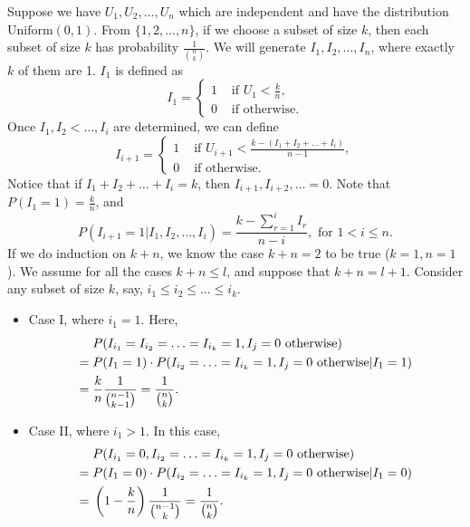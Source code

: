 \documentclass[15pt,a4paper]{book}
\theoremstyle{definition}
\begin{document}
Suppose we have $U_{1},U_{2},\ldots,U_{n}$ which are independent and have the distribution $\text{Uniform}(0,1)$. From $\{1,2,\ldots,n\}$, if we choose a subset of size $k$, then each subset of size $k$ has probability $\frac{1}{\binom{n}{k}}$. We will generate $I_{1},I_{2},\ldots,I_{n}$, where exactly $k$ of them are 1. $I_{1}$ is defined as
\begin{equation}
    I_{1} = \begin{cases}
        1 &\text{ if } U_{1} < \frac{k}{n},\\
        0 &\text{ if otherwise}.
    \end{cases}
\end{equation}
Once $I_{1},I_{2}<\ldots,I_{i}$ are determined, we can define
\begin{equation}
    I_{i+1} = \begin{cases}
        1 &\text{ if } U_{i+1} < \frac{k-(I_{1}+I_{2}+\ldots+I_{i})}{n-1},\\
        0 &\text{ if otherwise}.
    \end{cases}
\end{equation}
Notice that if $I_{1}+I_{2}+\ldots+I_{i} = k$, then $I_{i+1},I_{i+2},\ldots = 0$. Note that $P(I_{1}=1) = \frac{k}{n}$, and
\begin{equation}
    P(I_{i+1}=1|I_{1},I_{2},\ldots,I_{i}) = \frac{k-\sum_{r=1}^{i} I_{r}}{n-i}, \text{ for } 1 < i \leq n.
\end{equation}
If we do induction on $k+n$, we know the case $k+n = 2$ to be true ($k=1,n=1$). We assume for all the cases $k+n \leq l$, and suppose that $k+n = l+1$. Consider any subset of size $k$, say, $i_{1} \leq i_{2} \leq \ldots \leq i_{k}$.
\begin{itemize}
    \item Case I, where $i_{1} = 1$. Here,
    \begin{align}
        &P(I_{i_{1}}=I_{i_{2}}=\ldots=I_{i_{k}} = 1, I_{j} = 0 \text{ otherwise}) \notag \\ \notag
        =\; &P(I_{1}=1) \cdot P(I_{i_{2}}=\ldots=I_{i_{k}} = 1, I_{j} = 0 \text{ otherwise} |I_{1}=1) \notag \\
        =\; &\frac{k}{n} \frac{1}{\binom{n-1}{k-1}} = \frac{1}{\binom{n}{k}}. \notag
    \end{align}

    \item Case II, where $i_{1} > 1$. In this case,
    \begin{align}
        &P(I_{i_{1}}=0,I_{i_{2}}=\ldots=I_{i_{k}} = 1, I_{j} = 0 \text{ otherwise}) \notag \\ \notag
        =\; &P(I_{1}=0) \cdot P(I_{i_{2}}=\ldots=I_{i_{k}} = 1, I_{j} = 0 \text{ otherwise} |I_{1}=0) \notag \\
        =\; &\left(1-\frac{k}{n}\right) \frac{1}{\binom{n-1}{k}} = \frac{1}{\binom{n}{k}}. \notag
    \end{align}
\end{itemize}
\end{document}
